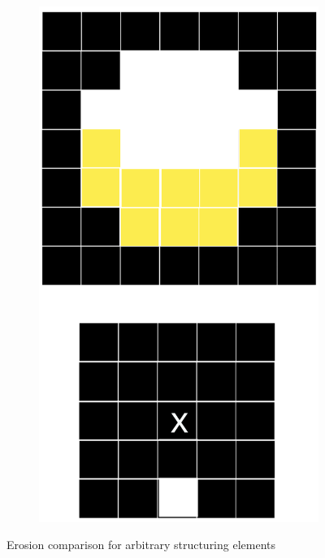 \documentclass[tikz,14pt,fleqn]{article}
\begin{document}
\begin{figure}[h!]
\begin{subfigure}[b]{0.195\linewidth}
        \includegraphics[width=\linewidth]{fig/4.er5.png}
    \end{subfigure}
    \caption{Erosion comparison for arbitrary structuring elements}
    \label{fig:4}
\end{figure}
\end{document}
